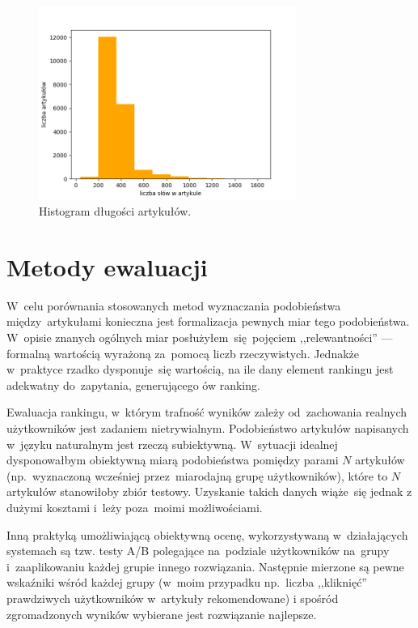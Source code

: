 \documentclass[pl]{minipw} %
\begin{document}
\begin{figure}[H]
	\centering
	\includegraphics[width=0.75\textwidth]{img/articles_length_hist.png}
	\caption{Histogram długości artykułów.}
\end{figure}

\chapter{Metody ewaluacji}

W~celu porównania stosowanych metod wyznaczania podobieństwa między~artykułami konieczna jest formalizacja pewnych miar tego podobieństwa. W~opisie znanych ogólnych miar posłużyłem~się pojęciem ,,relewantności'' --- formalną wartością wyrażoną za~pomocą liczb rzeczywistych. Jednakże w~praktyce rzadko dysponuje~się wartością, na ile dany element rankingu jest adekwatny do~zapytania, generującego ów ranking.  

Ewaluacja rankingu, w~którym trafność wyników zależy od~zachowania realnych użytkowników jest zadaniem nietrywialnym. Podobieństwo artykułów napisanych w~języku naturalnym jest rzeczą subiektywną. W~sytuacji idealnej dysponowałbym obiektywną miarą podobieństwa pomiędzy parami $N$ artykułów (np.~wyznaczoną wcześniej przez~miarodajną grupę użytkowników), które to $N$ artykułów stanowiłoby zbiór testowy. Uzyskanie takich danych wiąże~się jednak z dużymi kosztami i~leży poza~moimi możliwościami.

Inną praktyką umożliwiającą obiektywną ocenę, wykorzystywaną w~działających systemach są tzw. testy A/B polegające na~podziale użytkowników na~grupy i~zaaplikowaniu każdej grupie innego rozwiązania. Następnie mierzone są pewne wskaźniki wśród każdej grupy (w~moim przypadku np.~liczba ,,kliknięć'' prawdziwych użytkowników w~artykuły rekomendowane) i spośród zgromadzonych wyników wybierane jest rozwiązanie najlepsze.
\end{document}
